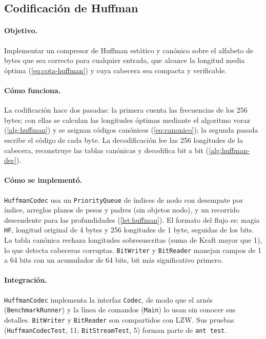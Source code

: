 \subsection{Codificación de Huffman}
\label{app:detalle-a}
\paragraph{Objetivo.} Implementar un compresor de Huffman estático y canónico sobre el alfabeto
de bytes que sea correcto para cualquier entrada, que alcance la longitud media óptima
(\cref{eq:cota-huffman}) y cuya cabecera sea compacta y verificable.

\paragraph{Cómo funciona.} La codificación hace dos pasadas: la primera cuenta las frecuencias
de los 256 bytes; con ellas se calculan las longitudes óptimas mediante el algoritmo voraz
(\cref{alg:huffman}) y se asignan códigos canónicos (\cref{eq:canonico}); la segunda pasada
escribe el código de cada byte. La decodificación lee las 256 longitudes de la cabecera,
reconstruye las tablas canónicas y decodifica bit a bit (\cref{alg:huffman-dec}).

\paragraph{Cómo se implementó.} \texttt{HuffmanCodec} usa un \texttt{PriorityQueue} de índices
de nodo con desempate por índice, arreglos planos de pesos y padres (sin objetos nodo), y un
recorrido descendente para las profundidades (\cref{lst:huffman}). El formato del flujo es:
magia \texttt{HF}, longitud original de 4 bytes y 256 longitudes de 1 byte, seguidas de los
bits. La tabla canónica rechaza longitudes sobresuscritas (suma de Kraft mayor que 1), lo que
detecta cabeceras corruptas. \texttt{BitWriter} y \texttt{BitReader} manejan campos de 1 a 64
bits con un acumulador de 64 bits, bit más significativo primero.

\paragraph{Integración.} \texttt{HuffmanCodec} implementa la interfaz \texttt{Codec}, de modo que
el arnés (\texttt{BenchmarkRunner}) y la línea de comandos (\texttt{Main}) lo usan sin conocer
sus detalles. \texttt{BitWriter} y \texttt{BitReader} son compartidos con LZW. Sus pruebas
(\texttt{HuffmanCodecTest}, 11; \texttt{BitStreamTest}, 5) forman parte de \texttt{ant test}.

